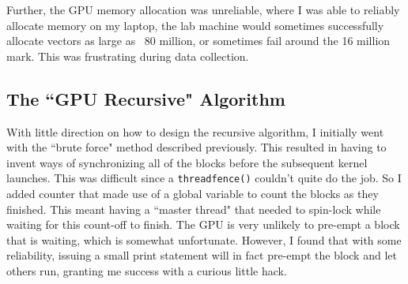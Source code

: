 \documentclass{article}
\begin{document}
Further, the GPU memory allocation was unreliable, where I was able to reliably allocate memory on my laptop, the lab machine would sometimes successfully allocate vectors as large as ~80 million, or sometimes fail around the 16 million mark. This was frustrating during data collection.

\subsection{The ``GPU Recursive" Algorithm}
With little direction on how to design the recursive algorithm, I initially went with the ``brute force" method described previously. This resulted in having to invent ways of synchronizing all of the blocks before the subsequent kernel launches. This was difficult since a \texttt{threadfence()} couldn't quite do the job. So I added counter that made use of a global variable to count the blocks as they finished. This meant having a ``master thread" that needed to spin-lock while waiting for this count-off to finish. The GPU is very unlikely to pre-empt a block that is waiting, which is somewhat unfortunate. However, I found that with some reliability, issuing a small print statement will in fact pre-empt the block and let others run, granting me success with a curious little hack.
  
\end{document}
